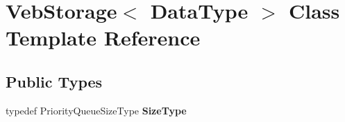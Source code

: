 \hypertarget{class_veb_storage}{
\section{VebStorage$<$ DataType $>$ Class Template Reference}
\label{class_veb_storage}
}
\subsection*{Public Types}
\begin{DoxyCompactItemize}
\item 
\hypertarget{class_veb_storage_a4555db788399f55f13fed4dfd7793a90}{
typedef PriorityQueueSizeType {\bfseries SizeType}}
\label{class_veb_storage_a4555db788399f55f13fed4dfd7793a90}

\end{DoxyCompactItemize}
